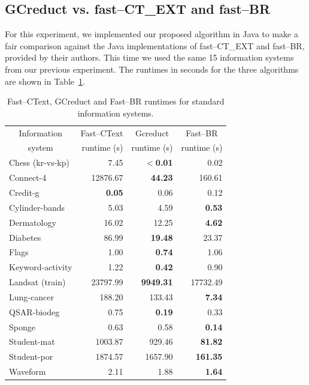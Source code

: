 \documentclass[authoryear,preprint,review,12pt]{elsarticle}
\begin{document}
\subsection{GCreduct vs. fast--CT\_EXT and fast--BR}\label{sub:java}
	
	For this experiment, we implemented our proposed algorithm in Java to make a fair comparison against the Java implementations of fast--CT\_EXT and fast--BR, provided by their authors. This time we used the same 15 information systems from our previous experiment. The runtimes in seconds for the three algorithms are shown in Table~\ref{tab:java}. 
	
	\begin{table}[!htb]
		\centering
		\caption{Fast--CText, GCreduct and Fast--BR runtimes for standard information systems.}
		\label{tab:java}
		\begin{tabular}{|l|r|r|r|}
			\hline
			\multicolumn{1}{|c|}{Information}  & Fast--CText & \multicolumn{1}{c|}{Gcreduct} & \multicolumn{1}{c|}{Fast--BR}  \\
			\multicolumn{1}{|c|}{system}       & runtime (s) & runtime (s)  & runtime (s)  \\
			\hline
			Chess (kr-vs-kp)          & 7.45          & \textbf{$<$0.01} & 0.02            \\
			Connect-4                 & 12876.67      & \textbf{44.23}   & 160.61          \\
			Credit-g                  & \textbf{0.05} & 0.06             & 0.12            \\
			Cylinder-bands            & 5.03          & 4.59             & \textbf{0.53}   \\
			Dermatology               & 16.02         & 12.25            & \textbf{4.62}   \\
			Diabetes                  & 86.99         & \textbf{19.48}   & 23.37           \\
			Flags                     & 1.00          & \textbf{0.74}    & 1.06            \\
			Keyword-activity          & 1.22          & \textbf{0.42}    & 0.90            \\
			Landsat (train)           & 23797.99      & \textbf{9949.31} & 17732.49        \\
			Lung-cancer               & 188.20        & 133.43           & \textbf{7.34}   \\
			QSAR-biodeg               & 0.75          & \textbf{0.19}    & 0.33            \\
			Sponge                    & 0.63          & 0.58             & \textbf{0.14}   \\
 			Student-mat               & 1003.87       & 929.46           & \textbf{81.82}  \\
			Student-por               & 1874.57       & 1657.90          & \textbf{161.35} \\
			Waveform                  & 2.11          & 1.88             & \textbf{1.64}   \\
			\hline
		\end{tabular}
	\end{table}
\end{document}
